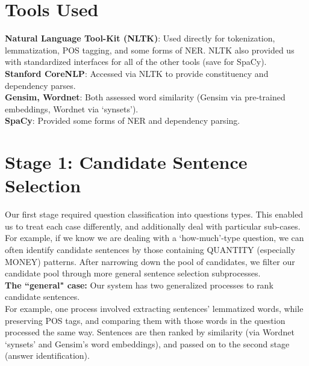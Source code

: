 \documentclass[a1,landscape]{a0poster}
\begin{document}
\begin{multicols}{3}
\color{DarkSlateGray} %

\section*{\LARGE Tools Used}
\textbf{Natural Language Tool-Kit (NLTK)}: Used directly for tokenization, lemmatization, POS tagging, and some forms of NER. NLTK also provided us with standardized interfaces for all of the other tools (save for SpaCy). \\
\textbf{Stanford CoreNLP}: Accessed via NLTK to provide constituency and dependency parses. \\
\textbf{Gensim, Wordnet}: Both assessed word similarity (Gensim via pre-trained embeddings, Wordnet via `synsets'). \\
\textbf{SpaCy}: Provided some forms of NER and dependency parsing.


\section*{\LARGE Stage 1: Candidate Sentence Selection}
Our first stage required question classification into questions types. This enabled us to treat each case differently, and additionally deal with particular sub-cases. \\
For example, if we know we are dealing with a `how-much'-type question, we can often identify candidate sentences by those containing QUANTITY (especially MONEY) patterns. After narrowing down the pool of candidates, we filter our candidate pool through more general sentence selection subprocesses. \\
\textbf{The ``general" case:} Our system has two generalized processes to rank candidate sentences.\\ For example, one process involved extracting sentences' lemmatized words, while preserving POS tags, and comparing them with those words in the question processed the same way. Sentences are then ranked by similarity (via Wordnet `synsets' and Gensim's word embeddings), and passed on to the second stage (answer identification).


\end{multicols}
\end{document}
